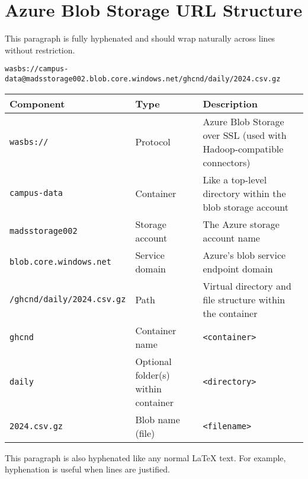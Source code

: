 \documentclass{article}
\begin{document}
\section*{Azure Blob Storage URL Structure}

This paragraph is fully hyphenated and should wrap naturally across lines without restriction.

\noindent\texttt{wasbs://campus-data@madsstorage002.blob.core.windows.net/ghcnd/daily/2024.csv.gz}

\bigskip

\noindent
\begin{tabular}{@{}L{0.35\textwidth} L{0.12\textwidth} L{0.50\textwidth}@{}}
\toprule
\textbf{Component} & \textbf{Type} & \textbf{Description} \\
\midrule
\texttt{wasbs://} & Protocol & Azure Blob Storage over SSL (used with Hadoop-compatible connectors) \\
\texttt{campus-data} & Container & Like a top-level directory within the blob storage account \\
\texttt{madsstorage002} & Storage account & The Azure storage account name \\
\texttt{blob.core.windows.net} & Service domain & Azure’s blob service endpoint domain \\
\texttt{/ghcnd/daily/2024.csv.gz} & Path & Virtual directory and file structure within the container \\
\texttt{ghcnd} & Container name & \texttt{<container>} \\
\texttt{daily} & Optional folder(s) within container & \texttt{<directory>}\\
\texttt{2024.csv.gz} & Blob name (file) &  \texttt{<filename>} \\
\bottomrule
\end{tabular}

\bigskip

This paragraph is also hyphenated like any normal LaTeX text. For example, hyphenation is useful when lines are justified.
\end{document}

